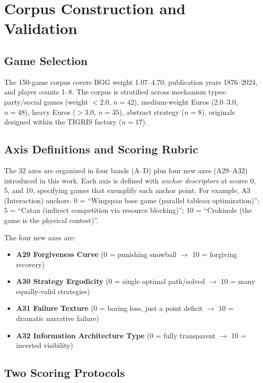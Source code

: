 \section{Corpus Construction and Validation}
\label{sec:method}

\subsection{Game Selection}

The 150-game corpus covers BGG weight 1.07--4.70, publication years 1876--2024,
and player counts 1--8. The corpus is stratified across mechanism types:
party/social games (weight $< 2.0$, $n=42$), medium-weight Euros (2.0--3.0, $n=48$),
heavy Euros ($> 3.0$, $n=35$), abstract strategy ($n=8$), originals designed within
the TIGRIS factory ($n=17$).

\subsection{Axis Definitions and Scoring Rubric}

The 32 axes are organized in four bands (A--D) plus four new axes (A29--A32)
introduced in this work.
Each axis is defined with \emph{anchor descriptors} at scores 0, 5, and 10,
specifying games that exemplify each anchor point.
For example, A3 (Interaction) anchors: 0 = ``Wingspan base game (parallel tableau optimization)'';
5 = ``Catan (indirect competition via resource blocking)'';
10 = ``Crokinole (the game is the physical contest)''.

The four new axes are:
\begin{itemize}
  \item \textbf{A29 Forgiveness Curve} (0 = punishing snowball $\to$ 10 = forgiving recovery)
  \item \textbf{A30 Strategy Ergodicity} (0 = single optimal path/solved $\to$ 10 = many equally-valid strategies)
  \item \textbf{A31 Failure Texture} (0 = boring loss, just a point deficit $\to$ 10 = dramatic narrative failure)
  \item \textbf{A32 Information Architecture Type} (0 = fully transparent $\to$ 10 = inverted visibility)
\end{itemize}

\subsection{Two Scoring Protocols}

